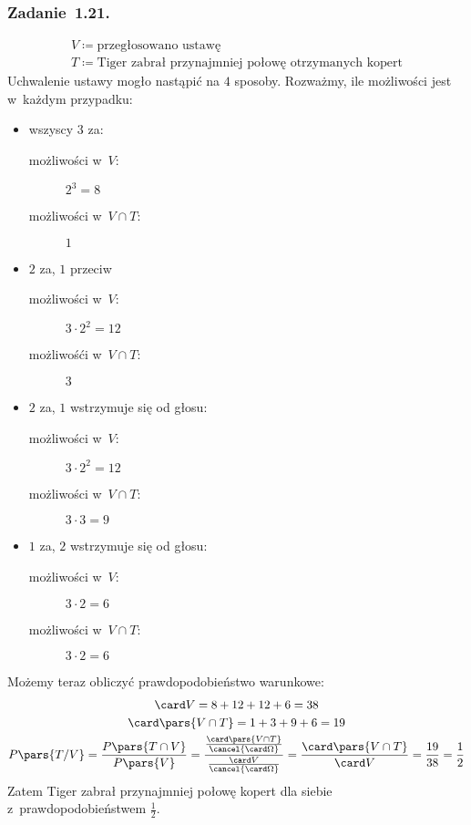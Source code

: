 \subsubsection*{Zadanie~1.21.}
\begin{gather*}
    V \coloneqq \text{przegłosowano ustawę}\\
    T \coloneqq \text{Tiger zabrał przynajmniej połowę otrzymanych kopert}
\end{gather*}
Uchwalenie ustawy mogło nastąpić na \(4\) sposoby. Rozważmy, ile możliwości jest w~każdym przypadku:
\begin{itemize}
    \item wszyscy \(3\) za:
        \begin{description}
            \item[możliwości w~\(V\):] \(2^3 = 8\)
            \item[możliwości w~\(V \cap T\):] \(1\)
        \end{description}
    \item \(2\) za, \(1\) przeciw
        \begin{description}
            \item[możliwości w~\(V\):] \(3 \cdot 2^2 = 12\)
            \item[możliwośći w~\(V \cap T\):] \(3\)
        \end{description}
    \item \(2\) za, \(1\) wstrzymuje się od głosu:
        \begin{description}
            \item[możliwości w~\(V\):] \(3 \cdot 2^2 = 12\)
            \item[możliwości w~\(V \cap T\):] \(3 \cdot 3 = 9\)
        \end{description}
    \item \(1\) za, \(2\) wstrzymuje się od głosu:
        \begin{description}
            \item[możliwości w~\(V\):] \(3 \cdot 2 = 6\)
            \item[możliwości w~\(V \cap T\):] \(3 \cdot 2 = 6\)
        \end{description}
\end{itemize}
Możemy teraz obliczyć prawdopodobieństwo warunkowe:
\begin{gather*}
    \card V = 8 + 12 + 12 + 6 = 38\\
    \card\pars{V \cap T} = 1 + 3 + 9 + 6 = 19\\
    P\pars{T / V}
    = \frac{P\pars{T \cap V}}{P\pars{V}}
    = \frac{\frac{\card\pars{V \cap T}}{\cancel{\card\Omega}}}{\frac{\card V}{\cancel{\card\Omega}}}
    = \frac{\card\pars{V \cap T}}{\card V}
    = \frac{19}{38}
    = \frac{1}{2}
\end{gather*}
Zatem Tiger zabrał przynajmniej połowę kopert dla siebie z~prawdopodobieństwem \(\frac{1}{2}\).
